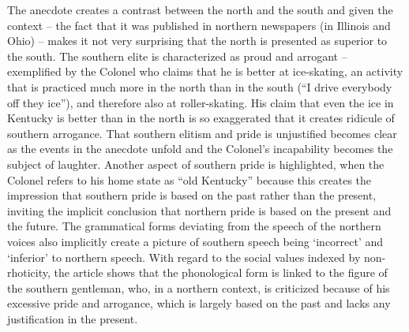 The anecdote creates a contrast between the north and the south and given the context – the fact that it was published in northern newspapers (in Illinois and Ohio) – makes it not very surprising that the north is presented as superior to the south. The southern elite is characterized as proud and arrogant – exemplified by the Colonel who claims that he is better at ice-skating, an activity that is practiced much more in the north than in the south (“I drive everybody off they ice”), and therefore also at roller-skating. His claim that even the ice in Kentucky is better than in the north is so exaggerated that it creates ridicule of southern arrogance. That southern elitism and pride is unjustified becomes clear as the events in the anecdote unfold and the Colonel’s incapability becomes the subject of laughter. Another aspect of southern pride is highlighted, when the Colonel refers to his home state as “old Kentucky” because this creates the impression that southern pride is based on the past rather than the present, inviting the implicit conclusion that northern pride is based on the present and the future. The grammatical forms deviating from the speech of the northern voices also implicitly create a picture of southern speech being ‘incorrect’ and ‘inferior’ to northern speech. With regard to the social values indexed by non-rhoticity, the article shows that the phonological form is linked to the figure of the southern gentleman, who, in a northern context, is criticized because of his excessive pride and arrogance, which is largely based on the past and lacks any justification in the present.

